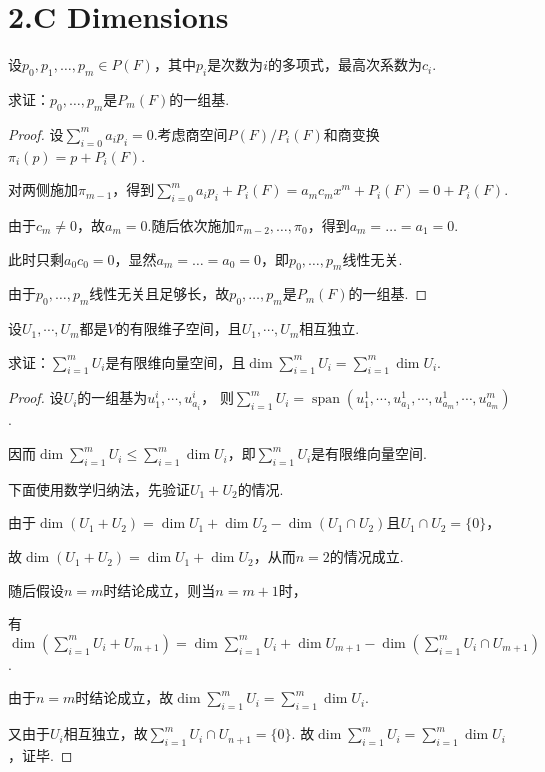 \section{2.C Dimensions}

\begin{problem}[10]\label{2.C.10}
    设\(p_0, p_1, \dots, p_m \in P(F)\)，其中\(p_i\)是次数为\(i\)的多项式，最高次系数为\(c_i\).
    
    求证：\(p_0, \dots, p_m\)是\(P_m(F)\)的一组基.
\end{problem}

\begin{proof}
    设\(\sum_{i=0}^m a_ip_i=0\).考虑商空间\(P(F)/P_i(F)\)和商变换\(\pi_i(p)=p+P_i(F)\).

    对两侧施加\(\pi_{m-1}\)，得到\(\sum_{i=0}^m a_ip_i+P_i(F)=a_mc_mx^m+P_i(F)=0+P_i(F)\).

    由于\(c_m \ne 0\)，故\(a_m=0\).随后依次施加\(\pi_{m-2}, \dots, \pi_{0}\)，得到\(a_m=\dots=a_1=0\).

    此时只剩\(a_0c_0=0\)，显然\(a_m=\dots=a_0=0\)，即\(p_0, \dots, p_m\)线性无关.

    由于\(p_0, \dots, p_m\)线性无关且足够长，故\(p_0, \dots, p_m\)是\(P_m(F)\)的一组基.
\end{proof}

\begin{problem}[14]\label{2.C.14}
    设\(U_1,\cdots,U_m\)都是\(V\)的有限维子空间，且\(U_1,\cdots,U_m\)相互独立.

    求证：\(\sum_{i=1}^m U_i\)是有限维向量空间，且\(\dim \sum_{i=1}^m U_i=\sum_{i=1}^m \dim U_i\).
\end{problem}

\begin{proof}
    设\(U_i\)的一组基为\(u_1^i,\cdots,u_{a_i}^i\)，
    则\(\sum_{i=1}^m U_i=\operatorname{span}(u_1^1,\cdots,u_{a_1}^1,\cdots,u_{a_m}^1,\cdots,u_{a_m}^m)\).

    因而\(\dim \sum_{i=1}^m U_i \leq \sum_{i=1}^m \dim U_i\)，即\(\sum_{i=1}^m U_i\)是有限维向量空间.

    下面使用数学归纳法，先验证\(U_1+U_2\)的情况.

    由于\(\dim (U_1+U_2)=\dim U_1+\dim U_2-\dim (U_1\cap U_2)\)且\(U_1\cap U_2=\{0\}\)，

    故\(\dim (U_1+U_2)=\dim U_1+\dim U_2\)，从而\(n=2\)的情况成立.

    随后假设\(n=m\)时结论成立，则当\(n=m+1\)时，

    有\(\dim (\sum_{i=1}^m U_i+U_{m+1})=\dim \sum_{i=1}^m U_i+\dim U_{m+1}-\dim (\sum_{i=1}^m U_i \cap U_{m+1})\).

    由于\(n=m\)时结论成立，故\(\dim \sum_{i=1}^m U_i=\sum_{i=1}^m \dim U_i\).

    又由于\(U_i\)相互独立，故\(\sum_{i=1}^m U_i \cap U_{n+1}=\{0\}\).
    故\(\dim \sum_{i=1}^m U_i=\sum_{i=1}^m \dim U_i\)，证毕.
\end{proof}

